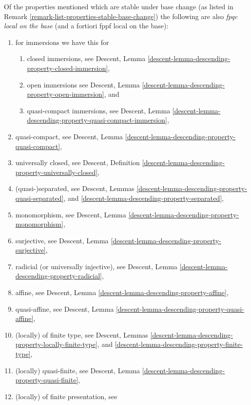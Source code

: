 \begin{remark}
\label{remark-list-properties-fpqc-local-base}
Of the properties mentioned which are stable under base change
(as listed in Remark \ref{remark-list-properties-stable-base-change})
the following are also {\it fpqc local on the base}
(and a fortiori fppf local on the base):
\begin{enumerate}
\item for immersions we have this for
\begin{enumerate}
\item closed immersions, see
Descent, Lemma \ref{descent-lemma-descending-property-closed-immersion},
\item open immersions see
Descent, Lemma \ref{descent-lemma-descending-property-open-immersion}, and
\item quasi-compact immersions, see
Descent,
Lemma \ref{descent-lemma-descending-property-quasi-compact-immersion},
\end{enumerate}
\item quasi-compact, see
Descent, Lemma \ref{descent-lemma-descending-property-quasi-compact},
\item universally closed, see
Descent,
Definition \ref{descent-lemma-descending-property-universally-closed},
\item (quasi-)separated, see
Descent, Lemmas
\ref{descent-lemma-descending-property-quasi-separated}, and
\ref{descent-lemma-descending-property-separated},
\item monomorphism, see
Descent, Lemma \ref{descent-lemma-descending-property-monomorphism},
\item surjective, see
Descent, Lemma \ref{descent-lemma-descending-property-surjective},
\item radicial (or universally injective), see
Descent, Lemma \ref{descent-lemma-descending-property-radicial},
\item affine, see
Descent, Lemma \ref{descent-lemma-descending-property-affine},
\item quasi-affine, see
Descent, Lemma \ref{descent-lemma-descending-property-quasi-affine},
\item (locally) of finite type, see
Descent,
Lemmas \ref{descent-lemma-descending-property-locally-finite-type}, and
\ref{descent-lemma-descending-property-finite-type},
\item (locally) quasi-finite, see
Descent, Lemma \ref{descent-lemma-descending-property-quasi-finite},
\item (locally) of finite presentation, see

\end{enumerate}
\end{remark}
